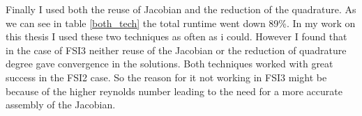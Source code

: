 Finally I used both the reuse of Jacobian and the reduction of the quadrature. As we can see in table \ref{both_tech} the total runtime went down 89\%. In my work on this thesis I used these two techniques as often as i could. However I found that in the case of FSI3 neither reuse of the Jacobian or the reduction of quadrature degree gave convergence in the solutions. Both techniques worked with great success in the FSI2 case. So the reason for it not working in FSI3 might be because of the higher reynolds number leading to the need for a more accurate assembly of the Jacobian.






